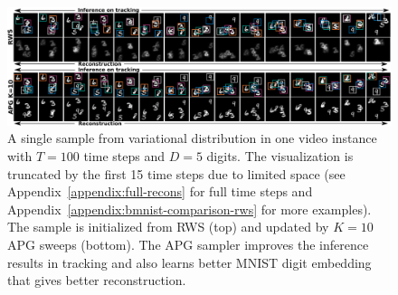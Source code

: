 \documentclass{article}
\theoremstyle{definition}
\begin{document}
\begin{figure}[!t]
  \centering
  \includegraphics[width=1.0\textwidth]{figures/bmnist-5digits-samples-with-rws.pdf}
  \caption{A single sample from variational distribution in one video instance with $T=100$ time steps and $D=5$ digits. The visualization is truncated by the first 15 time steps due to limited space (see Appendix~\ref{appendix:full-recons} for full time steps and Appendix~\ref{appendix:bmnist-comparison-rws} for more examples). The sample is initialized from RWS (top) and updated by $K=10$ APG sweeps (bottom). The APG sampler improves the inference results in tracking and also learns better MNIST digit embedding that gives better reconstruction.}
  \label{mnist-qualitative}
\end{figure}


\end{document}
